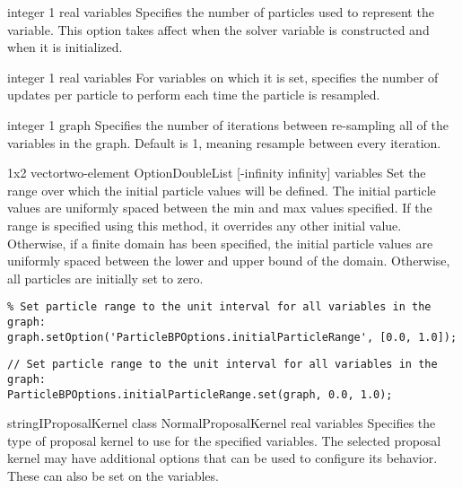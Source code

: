 
{integer}
{1}
{real variables}
{Specifies the number of particles used to represent the variable. This option takes affect when the solver variable is constructed and when it is initialized.}


{integer}
{1}
{real variables}
{For variables on which it is set, specifies the number of updates per particle to perform each time the particle is resampled.}


{integer}
{1}
{graph}
{Specifies the number of iterations between re-sampling all of the variables in the graph. Default is 1, meaning resample between every iteration.}


{\ifmatlab 1x2 vector\fi \ifjava two-element OptionDoubleList\fi}
{[-infinity infinity]}
{variables}
{Set the range over which the initial particle values will be defined. The initial particle values are uniformly spaced between the min and max values specified. If the range is specified using this method, it overrides any other initial value. Otherwise, if a finite domain has been specified, the initial particle values are uniformly spaced between the lower and upper bound of the domain. Otherwise, all particles are initially set to zero.}

\ifmatlab
\begin{lstlisting}
% Set particle range to the unit interval for all variables in the graph:
graph.setOption('ParticleBPOptions.initialParticleRange', [0.0, 1.0]);
\end{lstlisting}
\fi
\ifjava
\begin{lstlisting}
// Set particle range to the unit interval for all variables in the graph:
ParticleBPOptions.initialParticleRange.set(graph, 0.0, 1.0);
\end{lstlisting}
\fi


{\ifmatlab string\fi \ifjava IProposalKernel class\fi}
{NormalProposalKernel}
{real variables}
{Specifies the type of proposal kernel to use for the specified variables. The selected proposal kernel may have additional options that can be used to configure its behavior. These can also be set on the variables.}

